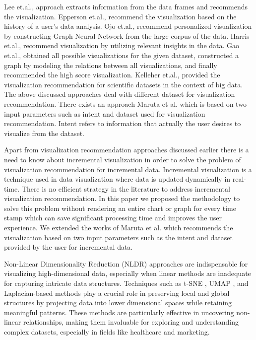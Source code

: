 Lee et.al., \cite{lux} approach extracts information from the data frames and recommends the visualization. Epperson et.al., \cite{leverage} recommend the visualization based on the history of a user’s data analysis. Ojo et.al., \cite{visgnn} recommend personalized visualization by constructing Graph Neural Network from the large corpus of the data. Harris et.al., \cite{insight} recommend visualization by utilizing relevant insights in the data. Gao et.al., \cite{vizgrank} obtained all possible visualizations for the given dataset, constructed a graph by modeling the relations between all visualizations, and finally recommended the high score visualization. Kelleher et.al., \cite{intro} provided the visualization recommendation for scientific datasets in the context of big data. 
The above discussed approaches deal with different dataset for visualization recommendation. There exists an approach Maruta et al. \cite{ref_intent}  which is based on two input parameters such as intent and dataset used for visualization recommendation. Intent refers to information that actually the user desires to visualize from the dataset.



Apart from visualization recommendation approaches discussed earlier there is a need to know about incremental visualization in order to solve the problem of visualization recommendation for incremental data. Incremental visualization \cite{enhanced} is a technique used in data visualization where data is updated dynamically in real-time. There is no efficient strategy in the literature to address incremental visualization recommendation. In this paper we proposed the methodology to solve this problem without rendering an entire chart or graph for every time stamp which can save significant processing time and improves the user experience. We extended the works of Maruta et al. \cite{ref_intent} which recommends the visualization based on two input parameters such as the intent and dataset provided by the user for incremental data.


Non-Linear Dimensionality Reduction (NLDR) approaches are indispensable for visualizing high-dimensional data, especially when linear methods are inadequate for capturing intricate data
structures. Techniques such as t-SNE \cite{tsne}, UMAP \cite{umap_reference}, and Laplacian-based methods \cite{belkin2001laplacian} \cite{sun2023laplacian} play a crucial role in preserving local and global structures by projecting data into lower dimensional
spaces while retaining meaningful patterns. These methods are particularly effective in
uncovering non-linear relationships, making them invaluable for exploring and understanding
complex datasets, especially in fields like healthcare and marketing.

